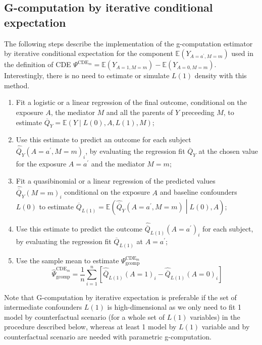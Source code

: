\documentclass[
]{book}
\begin{document}
\subsection{G-computation by iterative conditional expectation}\label{ChapGcomp-CDE-ICE}

The following steps describe the implementation of the g-computation estimator by iterative conditional expectation for the component \(\mathbb{E}(Y_{A=a^\prime,M=m})\) used in the definition of CDE \(\Psi^{\text{CDE}_m} = \mathbb{E}(Y_{A=1,M=m}) - \mathbb{E}(Y_{A=0,M=m})\). Interestingly, there is no need to estimate or simulate \(L(1)\) density with this method.

\begin{enumerate}
\def\labelenumi{\arabic{enumi}.}
\item
  Fit a logistic or a linear regression of the final outcome, conditional on the exposure \(A\), the mediator \(M\) and all the parents of \(Y\) preceeding \(M\), to estimate \(\overline{Q}_{Y} = \mathbb{E}(Y \mid L(0),A,L(1),M)\);
\item
  Use this estimate to predict an outcome for each subject \(\hat{\overline{Q}}_{Y}(A=a^\prime,M=m)_i\), by evaluating the regression fit \(\overline{Q}_{Y}\) at the chosen value for the exposure \(A=a^\prime\) and the mediator \(M=m\);
\item
  Fit a quasibinomial or a linear regression of the predicted values \(\hat{\overline{Q}}_{Y}(M=m)_i\) conditional on the exposure \(A\) and baseline confounders \(L(0)\) to estimate \(\overline{Q}_{L(1)} = \mathbb{E}\left(\hat{\overline{Q}}_{Y}(A=a^\prime,M=m) \middle| L(0),A\right)\);
\item
  Use this estimate to predict the outcome \(\hat{\overline{Q}}_{L(1)}(A=a^\prime)_i\) for each subject, by evaluating the regression fit \(\overline{Q}_{L(1)}\) at \(A=a^\prime\);
\item
  Use the sample mean to estimate \(\Psi^{\text{CDE}_m}_{\text{gcomp}}\)
  \begin{equation}
  \hat{\Psi}^{\text{CDE}_m}_{\text{gcomp}} = \frac{1}{n} \sum_{i=1}^n \left[ \hat{\overline{Q}}_{L(1)}(A=1)_i - \hat{\overline{Q}}_{L(1)}(A=0)_i \right]
  \end{equation}
\end{enumerate}

Note that G-computation by iterative expectation is preferable if the set of intermediate confounders \(L(1)\) is high-dimensional as we only need to fit 1 model by counterfactual scenario (for a whole set of \(L(1)\) variables) in the procedure described below, whereas at least 1 model by \(L(1)\) variable and by counterfactual scenario are needed with parametric g-computation.
\end{document}
